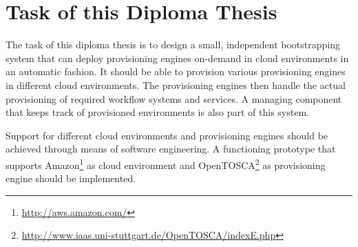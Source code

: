 \section{Task of this Diploma Thesis}

The task of this diploma thesis is to design a small, independent bootstrapping system that can deploy provisioning engines on-demand in cloud environments in an automatic fashion.
It should be able to provision various provisioning engines in different cloud environments.
The provisioning engines then handle the actual provisioning of required workflow systems and services.
A managing component that keeps track of provisioned environments is also part of this system.

Support for different cloud environments and provisioning engines should be achieved through means of software engineering.
A functioning prototype that supports Amazon\footnote{\url{http://aws.amazon.com/}} as cloud environment and OpenTOSCA\footnote{\url{http://www.iaas.uni-stuttgart.de/OpenTOSCA/indexE.php}} as provisioning engine should be implemented.
